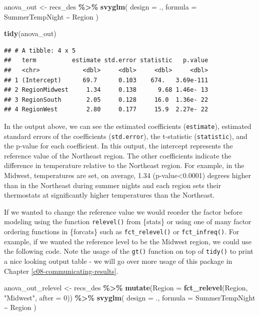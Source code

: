 \documentclass[
]{krantz}
\makeatletter
\newenvironment{Shaded}{\begin{snugshade}}{\end{snugshade}}
\newcommand{\AttributeTok}[1]{\textcolor[rgb]{0.27,0.27,0.27}{#1}}
\newcommand{\DecValTok}[1]{\textcolor[rgb]{0.06,0.06,0.06}{#1}}
\newcommand{\FunctionTok}[1]{\textcolor[rgb]{0.27,0.27,0.27}{\textbf{#1}}}
\newcommand{\NormalTok}[1]{#1}
\newcommand{\OtherTok}[1]{\textcolor[rgb]{0.37,0.37,0.37}{#1}}
\newcommand{\SpecialCharTok}[1]{\textcolor[rgb]{0.43,0.43,0.43}{\textbf{#1}}}
\newcommand{\StringTok}[1]{\textcolor[rgb]{0.5,0.5,0.5}{#1}}
\newenvironment{kframe}{%
\medskip{}
\setlength{\fboxsep}{.8em}
 \def\at@end@of@kframe{}%
 \ifinner\ifhmode%
  \def\at@end@of@kframe{\end{minipage}}%
  \begin{minipage}{\columnwidth}%
 \fi\fi%
 \def\FrameCommand##1{\hskip\@totalleftmargin \hskip-\fboxsep
 \colorbox{shadecolor}{##1}\hskip-\fboxsep
     \hskip-\linewidth \hskip-\@totalleftmargin \hskip\columnwidth}%
 \MakeFramed {\advance\hsize-\width
   \@totalleftmargin\z@ \linewidth\hsize
   \@setminipage}}%
 {\par\unskip\endMakeFramed%
 \at@end@of@kframe}
\renewenvironment{Shaded}{\begin{kframe}}{\end{kframe}}
\makeatother
\begin{document}
\begin{Shaded}
\begin{Highlighting}[]
\NormalTok{anova\_out }\OtherTok{\textless{}{-}}\NormalTok{ recs\_des }\SpecialCharTok{\%\textgreater{}\%}
  \FunctionTok{svyglm}\NormalTok{(}
    \AttributeTok{design =}\NormalTok{ .,}
    \AttributeTok{formula =}\NormalTok{ SummerTempNight }\SpecialCharTok{\textasciitilde{}}\NormalTok{ Region}
\NormalTok{  )}

\FunctionTok{tidy}\NormalTok{(anova\_out)}
\end{Highlighting}
\end{Shaded}

\begin{verbatim}
## # A tibble: 4 x 5
##   term          estimate std.error statistic   p.value
##   <chr>            <dbl>     <dbl>     <dbl>     <dbl>
## 1 (Intercept)      69.7      0.103    674.   3.69e-111
## 2 RegionMidwest     1.34     0.138      9.68 1.46e- 13
## 3 RegionSouth       2.05     0.128     16.0  1.36e- 22
## 4 RegionWest        2.80     0.177     15.9  2.27e- 22
\end{verbatim}

In the output above, we can see the estimated coefficients (\texttt{estimate}), estimated standard errors of the coefficients (\texttt{std.error}), the t-statistic (\texttt{statistic}), and the p-value for each coefficient. In this output, the intercept represents the reference value of the Northeast region. The other coefficients indicate the difference in temperature relative to the Northeast region. For example, in the Midwest, temperatures are set, on average, 1.34 (p-value\textless0.0001) degrees higher than in the Northeast during summer nights and each region sets their thermostats at significantly higher temperatures than the Northeast.

If we wanted to change the reference value we would reorder the factor before modeling using the function \texttt{relevel()} from \{stats\} or using one of many factor ordering functions in \{forcats\} such as \texttt{fct\_relevel()} or \texttt{fct\_infreq()}. For example, if we wanted the reference level to be the Midwest region, we could use the following code. Note the usage of the \texttt{gt()} function on top of \texttt{tidy()} to print a nice looking output table - we will go over more usage of this package in Chapter \ref{c08-communicating-results}.

\begin{Shaded}
\begin{Highlighting}[]
\NormalTok{anova\_out\_relevel }\OtherTok{\textless{}{-}}\NormalTok{ recs\_des }\SpecialCharTok{\%\textgreater{}\%}
  \FunctionTok{mutate}\NormalTok{(}\AttributeTok{Region =} \FunctionTok{fct\_relevel}\NormalTok{(Region, }\StringTok{"Midwest"}\NormalTok{, }\AttributeTok{after =} \DecValTok{0}\NormalTok{)) }\SpecialCharTok{\%\textgreater{}\%}
  \FunctionTok{svyglm}\NormalTok{(}
    \AttributeTok{design =}\NormalTok{ .,}
    \AttributeTok{formula =}\NormalTok{ SummerTempNight }\SpecialCharTok{\textasciitilde{}}\NormalTok{ Region}
\NormalTok{  )}
\end{Highlighting}
\end{Shaded}
\end{document}
